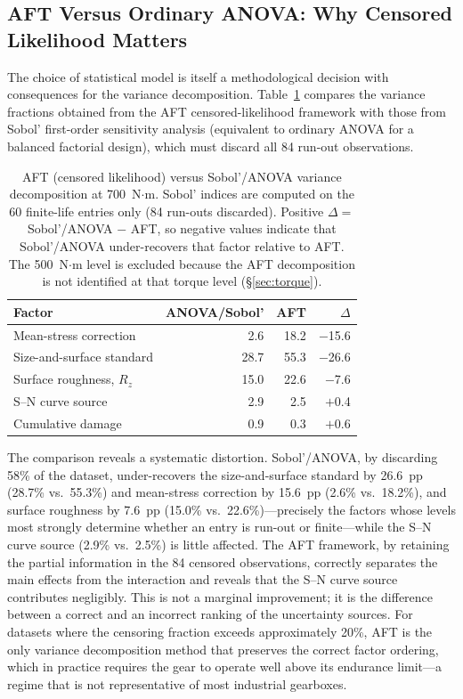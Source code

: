 \documentclass[twocolumn,12pt,a4paper]{article}
\begin{document}
\subsection{AFT Versus Ordinary ANOVA: Why Censored Likelihood Matters}
\label{sec:aft_vs_anova}

The choice of statistical model is itself a methodological decision
with consequences for the variance decomposition. Table~\ref{tab:aft_vs_anova}
compares the variance fractions obtained from the AFT censored-likelihood
framework with those from Sobol' first-order sensitivity analysis
(equivalent to ordinary ANOVA for a balanced factorial design), which
must discard all 84 run-out observations.

\begin{table}[ht]
\centering
\caption{AFT (censored likelihood) versus Sobol'/ANOVA variance
decomposition at 700~N$\cdot$m. Sobol' indices are computed on the
60 finite-life entries only (84 run-outs discarded). Positive
$\Delta = $ Sobol'/ANOVA $-$ AFT, so negative values indicate that
Sobol'/ANOVA under-recovers that factor relative to AFT. The
500~N$\cdot$m level is excluded because the AFT decomposition is not
identified at that torque level (\S\ref{sec:torque}).\label{tab:aft_vs_anova}}
\footnotesize
\begin{tabular}{lrrr}
\toprule
Factor & ANOVA/Sobol' & AFT & $\Delta$ \\
\midrule
Mean-stress correction & 2.6 & 18.2 & $-$15.6 \\
Size-and-surface standard & 28.7 & 55.3 & $-$26.6 \\
Surface roughness, $R_z$ & 15.0 & 22.6 & $-$7.6 \\
S--N curve source & 2.9 & 2.5 & $+$0.4 \\
Cumulative damage & 0.9 & 0.3 & $+$0.6 \\
\bottomrule
\end{tabular}
\end{table}

The comparison reveals a systematic distortion. Sobol'/ANOVA, by
discarding 58\% of the dataset, under-recovers the size-and-surface
standard by 26.6~pp (28.7\% vs.\ 55.3\%) and mean-stress correction by
15.6~pp (2.6\% vs.\ 18.2\%), and surface roughness by 7.6~pp (15.0\%
vs.\ 22.6\%)---precisely the factors whose levels most
strongly determine whether an entry is run-out or finite---while the
S--N curve source (2.9\% vs.\ 2.5\%) is little affected. The AFT
framework, by retaining the partial
information in the 84 censored observations, correctly separates the
main effects from the interaction and reveals that the S--N curve
source contributes negligibly. This is not a marginal improvement;
it is the difference between a correct and an incorrect ranking of the
uncertainty sources. For datasets where the censoring fraction exceeds
approximately 20\%, AFT is the only variance decomposition method that
preserves the correct factor ordering, which in practice
requires the gear to operate well above its endurance limit---a regime
that is not representative of most industrial gearboxes.
\end{document}
